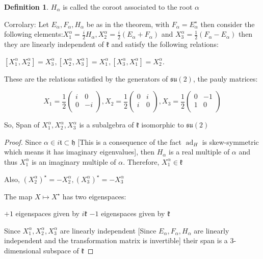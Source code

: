 \documentclass{article}
\theoremstyle{definition}
\newtheorem{definition}{Definition}
\begin{document}
\begin{definition}
    \(H_\alpha \) is called the coroot associated to the root \(\alpha \) 
\end{definition}

Corrolary: Let \(E_\alpha ,F_\alpha ,H_\alpha \) be as in the theorem, with \(F_\alpha = E_\alpha ^{\star} \) then consider the following elements:\(X_1^\alpha =\frac{i}{2}H_\alpha , X_2^\alpha =\frac{i}{2}(E_\alpha +F_\alpha)\) and \(X_3^\alpha =\frac{1}{2}\left( F_\alpha -E_\alpha  \right) \) then they are linearly independent of \(\mathfrak{k} \) and satisfy the following relations:

\(\left[ X_1^\alpha ,X_2^\alpha  \right] =X_3^\alpha , \left[ X_2^\alpha ,X_3^\alpha  \right] =X_1^\alpha ,\left[ X_3^\alpha ,X_1^\alpha  \right] =X_2^\alpha \).

These are the relations satisfied by the generators of \(\mathfrak{su} (2)\), the pauly matrices:

\[
    X_1=\frac{1}{2}\begin{pmatrix}
        i &  0 \\
        0 &  -i \\
    \end{pmatrix}, X_2 = \frac{1}{2}\begin{pmatrix}
        0 &  i \\
        i &  0 \\
    \end{pmatrix}, X_3=\frac{1}{2}\begin{pmatrix}
        0 &  -1 \\
        1 &  0 \\
    \end{pmatrix}
\]

So, Span of \(X_1^\alpha ,X_2^\alpha ,X_3^\alpha \) is a subalgebra of \(\mathfrak{k} \) isomorphic to \(\mathfrak{su}(2) \) 

\begin{proof}
    Since \(\alpha \in i\mathfrak{t} \subset \mathfrak{h} \) [This is a consequence of the fact \(\operatorname{ad}_H \) is skew-symmetric which means it has imaginary eigenvalues], then \(H_\alpha \) is a real multiple of \(\alpha \) and thus \(X_1^\alpha\) is an imaginary multiple of \(\alpha \). Therefore, \(X_1^\alpha \in \mathfrak{k}\)
    
    Also, \((X_2^\alpha )^{\star} = - X_2^\alpha ,(X_3^\alpha )^{\star} =-X_3^\alpha \) 
    
    The map \(X\mapsto X^{\star} \) has two eigenspaces:

    \(+1\) eigenspaces given by \(i\mathfrak{k} \) 
    \(-1\) eigenspaces given by \(\mathfrak{k} \) 

    Since \(X_1^\alpha ,X_2^\alpha ,X_3^\alpha \) are linearly independent [Since \(E_\alpha ,F_\alpha ,H_\alpha \) are linearly independent and the transformation matrix is invertible] their span is a 3-dimensional subspace of \(\mathfrak{k} \)

\end{proof}
\end{document}
